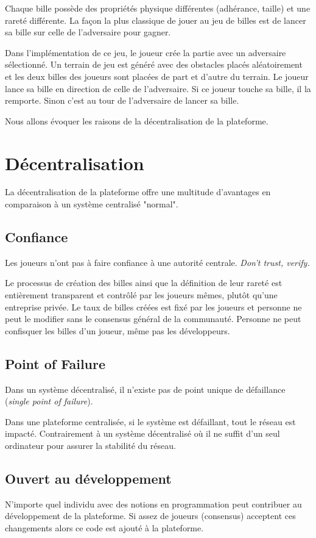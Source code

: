 \documentclass{article}
\begin{document}
Chaque bille possède des propriétés physique différentes (adhérance, taille) et une rareté différente.
La façon la plus classique de jouer au jeu de billes est de lancer sa bille sur celle de l'adversaire pour gagner.


Dans l'implémentation de ce jeu, le joueur crée la partie avec un adversaire sélectionné.
Un terrain de jeu est généré avec des obstacles placés aléatoirement et les deux billes des joueurs sont placées de part et d'autre du terrain. Le joueur lance sa bille en direction de celle de l'adversaire. Si ce joueur touche sa bille, il la remporte. Sinon c'est au tour de l'adversaire de lancer sa bille. 

Nous allons évoquer les raisons de la décentralisation de la plateforme.

\section{Décentralisation}
La décentralisation de la plateforme offre une multitude d'avantages en comparaison à un système centralisé "normal".

\subsection{Confiance}
Les joueurs n'ont pas à faire confiance à une autorité centrale. 
\textit{Don't trust, verify.}

Le processus de création des billes ainsi que la définition de leur rareté est entièrement transparent et contrôlé par les joueurs mêmes, plutôt qu'une entreprise privée. Le taux de billes créées est fixé par les joueurs et personne ne peut le modifier sans le consensus général de la communauté. Personne ne peut confisquer les billes d'un joueur, même pas les développeurs.

\subsection{Point of Failure}
Dans un système décentralisé, il n'existe pas de point unique de défaillance (\textit{single point of failure}). 

Dans une plateforme centralisée, si le système est défaillant, tout le réseau est impacté. Contrairement à un système décentralisé où il ne suffit d'un seul ordinateur pour assurer la stabilité du réseau.

\subsection{Ouvert au développement}
N'importe quel individu avec des notions en programmation peut contribuer au développement de la plateforme.
Si assez de joueurs (consensus) acceptent ces changements alors ce code est ajouté à la plateforme.
\end{document}
